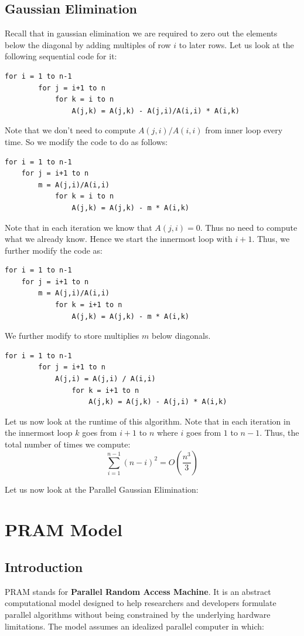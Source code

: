 \documentclass[12pt]{book}
\begin{document}
\section{Gaussian Elimination}
Recall that in gaussian elimination we are required to zero out the elements below the diagonal by adding multiples of row $i$ to later rows. Let us look at the following sequential code for it:
\begin{lstlisting}[style=cppstyle]
    for i = 1 to n-1
        for j = i+1 to n
            for k = i to n
                A(j,k) = A(j,k) - A(j,i)/A(i,i) * A(i,k)
\end{lstlisting}
Note that we don't need to compute $A(j,i)/A(i,i)$ from inner loop every time. So we modify the code to do as follows:
\begin{lstlisting}[style = cppstyle]
for i = 1 to n-1
    for j = i+1 to n
        m = A(j,i)/A(i,i)
            for k = i to n
                A(j,k) = A(j,k) - m * A(i,k)
\end{lstlisting}
Note that in each iteration we know that $A(j,i) = 0$. Thus no need to compute what we already know. Hence we start the innermost loop with $i+1$. Thus, we further modify the code as:
\begin{lstlisting}[style = cppstyle]
for i = 1 to n-1
    for j = i+1 to n
        m = A(j,i)/A(i,i)
            for k = i+1 to n
                A(j,k) = A(j,k) - m * A(i,k)
\end{lstlisting}
We further modify to store multiplies $m$ below diagonals.
\begin{lstlisting}[style = cppstyle]
    for i = 1 to n-1
        for j = i+1 to n
            A(j,i) = A(j,i) / A(i,i)
                for k = i+1 to n
                    A(j,k) = A(j,k) - A(j,i) * A(i,k)
\end{lstlisting}
Let us now look at the runtime of this algorithm. Note that in each iteration in the innermost loop $k$ goes from $i+1$ to $n$ where $i$ goes from $1$ to $n-1$. Thus, the total number of times we compute:
\[
\sum_{i=1}^{n-1} (n-i)^2 =  O\left(\frac{n^3}{3}\right) 
\]

Let us now look at the Parallel Gaussian Elimination:



\chapter{PRAM Model}
\section{Introduction}
PRAM stands for \textbf{Parallel Random Access Machine}. It is an abstract computational model designed to help researchers and developers formulate parallel algorithms without being constrained by the underlying hardware limitations. The model assumes an idealized parallel computer in which:
\end{document}

